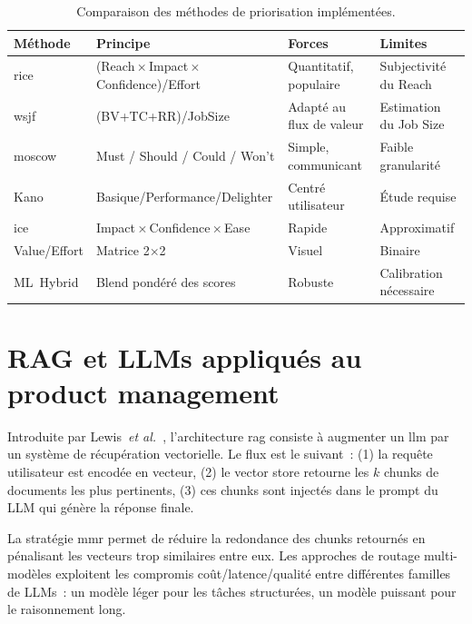 \begin{table}[H]\centering\small
\caption{Comparaison des méthodes de priorisation implémentées.}
\label{tab:prio-methods}
\begin{tabularx}{\linewidth}{lXXl}
\toprule
\textbf{Méthode} & \textbf{Principe} & \textbf{Forces} & \textbf{Limites}\\
\midrule
\gls{rice} & (Reach\,$\times$\,Impact\,$\times$\,Confidence)/Effort
  & Quantitatif, populaire & Subjectivité du Reach\\
\gls{wsjf} & (BV+TC+RR)/JobSize
  & Adapté au flux de valeur & Estimation du Job Size\\
\gls{moscow} & Must / Should / Could / Won't
  & Simple, communicant & Faible granularité\\
Kano & Basique/Performance/Delighter
  & Centré utilisateur & Étude requise\\
\gls{ice} & Impact\,$\times$\,Confidence\,$\times$\,Ease
  & Rapide & Approximatif\\
Value/Effort & Matrice 2$\times$2 & Visuel & Binaire\\
ML~Hybrid & Blend pondéré des scores
  & Robuste & Calibration nécessaire\\
\bottomrule
\end{tabularx}
\end{table}

\section{RAG et LLMs appliqués au product management}
Introduite par Lewis~\textit{et al.}~\cite{lewis2020rag}, l'architecture
\gls{rag} consiste à augmenter un \gls{llm} par un système de
récupération vectorielle. Le flux est le suivant~: (1) la requête
utilisateur est encodée en vecteur, (2) le vector store retourne les
$k$ chunks de documents les plus pertinents, (3) ces chunks sont
injectés dans le prompt du LLM qui génère la réponse finale.

La stratégie \gls{mmr} permet de réduire la redondance des chunks
retournés en pénalisant les vecteurs trop similaires entre eux. Les
approches de routage multi-modèles exploitent les compromis
coût/latence/qualité entre différentes familles de LLMs~: un modèle
léger pour les tâches structurées, un modèle puissant pour le
raisonnement long.

